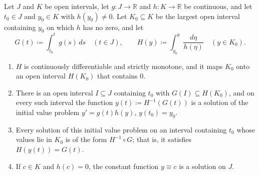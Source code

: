 \begin{theorem}
\label{thm:separable}
Let $J$ and $K$ be open intervals, let $g\colon J\to\mathbb R$ and $h\colon K\to\mathbb R$ be continuous, and let $t_0\in J$ and $y_0\in K$ with $h(y_0)\ne0$. Let $K_0\subseteq K$ be the largest open interval containing $y_0$ on which $h$ has no zero, and let
\[
G(t)\coloneqq\int_{t_0}^tg(s)\,ds\quad(t\in J),\qquad H(y)\coloneqq\int_{y_0}^y\frac{d\eta}{h(\eta)}\quad(y\in K_0).
\]
\begin{enumerate}
\item $H$ is continuously differentiable and strictly monotone, and it maps $K_0$ onto an open interval $H(K_0)$ that contains $0$.
\item There is an open interval $I\subseteq J$ containing $t_0$ with $G(I)\subseteq H(K_0)$, and on every such interval the function $y(t)\coloneqq H^{-1}(G(t))$ is a solution of the initial value problem $y'=g(t)h(y)$, $y(t_0)=y_0$.
\item Every solution of this initial value problem on an interval containing $t_0$ whose values lie in $K_0$ is of the form $H^{-1}\circ G$; that is, it satisfies $H(y(t))=G(t)$.
\item If $c\in K$ and $h(c)=0$, the constant function $y\equiv c$ is a solution on $J$.
\end{enumerate}
\end{theorem}


